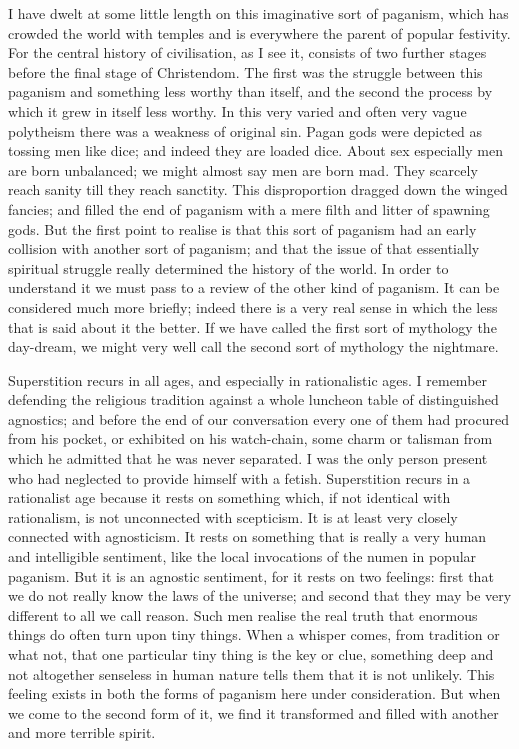 I have dwelt at some little length on this imaginative sort of paganism, which has crowded the world with temples and is everywhere the parent of popular festivity. For the central history of civilisation, as I see it, consists of two further stages before the final stage of Christendom. The first was the struggle between this paganism and something less worthy than itself, and the second the process by which it grew in itself less worthy. In this very varied and often very vague polytheism there was a weakness of original sin. Pagan gods were depicted as tossing men like dice; and indeed they are loaded dice. About sex especially men are born unbalanced; we might almost say men are born mad. They scarcely reach sanity till they reach sanctity. This disproportion dragged down the winged fancies; and filled the end of paganism with a mere filth and litter of spawning gods. But the first point to realise is that this sort of paganism had an early collision with another sort of paganism; and that the issue of that essentially spiritual struggle really determined the history of the world. In order to understand it we must pass to a review of the other kind of paganism. It can be considered much more briefly; indeed there is a very real sense in which the less that is said about it the better. If we have called the first sort of mythology the day-dream, we might very well call the second sort of mythology the nightmare.

Superstition recurs in all ages, and especially in rationalistic ages. I remember defending the religious tradition against a whole luncheon table of distinguished agnostics; and before the end of our conversation every one of them had procured from his pocket, or exhibited on his watch-chain, some charm or talisman from which he admitted that he was never separated. I was the only person present who had neglected to provide himself with a fetish. Superstition recurs in a rationalist age because it rests on something which, if not identical with rationalism, is not unconnected with scepticism. It is at least very closely connected with agnosticism. It rests on something that is really a very human and intelligible sentiment, like the local invocations of the numen in popular paganism. But it is an agnostic sentiment, for it rests on two feelings: first that we do not really know the laws of the universe; and second that they may be very different to all we call reason. Such men realise the real truth that enormous things do often turn upon tiny things. When a whisper comes, from tradition or what not, that one particular tiny thing is the key or clue, something deep and not altogether senseless in human nature tells them that it is not unlikely. This feeling exists in both the forms of paganism here under consideration. But when we come to the second form of it, we find it transformed and filled with another and more terrible spirit.

